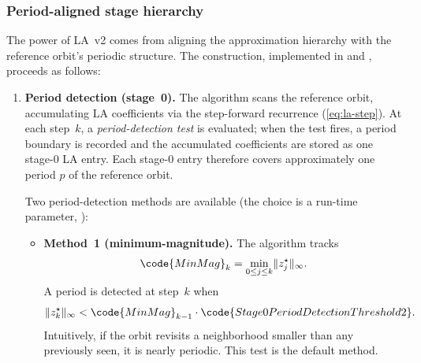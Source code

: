 \subsubsection{Period-aligned stage hierarchy}
\label{sec:la-stage-hierarchy}

The power of LA~v2 comes from aligning the approximation hierarchy
with the reference orbit's periodic structure.  The construction,
implemented in  and
, proceeds as follows:
\begin{enumerate}
  \item \textbf{Period detection (stage~0).}  The algorithm scans the
        reference orbit, accumulating LA coefficients via the step-forward
        recurrence (\cref{eq:la-step}).  At each step~\(k\), a
        \emph{period-detection test} is evaluated; when the test fires,
        a period boundary is recorded and the accumulated
        coefficients are stored as one stage-0 LA entry.  Each stage-0
        entry therefore covers approximately one period \(p\) of the
        reference orbit.

        Two period-detection methods are available (the choice is a
        run-time parameter, ):
        \begin{itemize}
          \item \textbf{Method~1 (minimum-magnitude).}  The algorithm
                tracks
                \[
                \code{MinMag}_k = \min_{0 \le j \le k}
                  \lVert z_j^\star \rVert_\infty.
                \]
                A period is detected at step~\(k\) when
                \begin{equation}
                \lVert z_k^\star \rVert_\infty
                  < \code{MinMag}_{k-1}
                    \cdot \code{Stage0PeriodDetectionThreshold2}.
                \label{eq:period-detect-minmag}
                \end{equation}
                Intuitively, if the orbit revisits a neighborhood
                smaller than any previously seen, it is nearly periodic.
                This test is the default method.


\end{itemize}
\end{enumerate}
